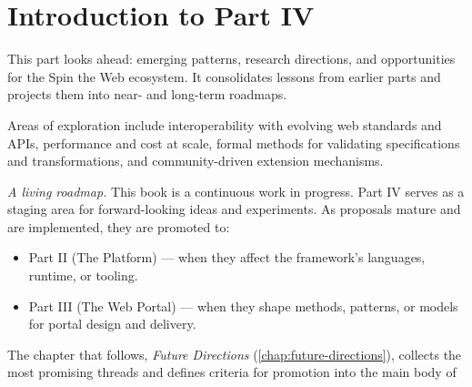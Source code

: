 
\chapter*{Introduction to Part IV}
\label{part:future}

This part looks ahead: emerging patterns, research directions, and opportunities for the Spin the Web ecosystem. It consolidates lessons from earlier parts and projects them into near- and long-term roadmaps.

Areas of exploration include interoperability with evolving web standards and APIs, performance and cost at scale, formal methods for validating specifications and transformations, and community-driven extension mechanisms.

\textit{A living roadmap.} This book is a continuous work in progress. Part IV serves as a staging area for forward-looking ideas and experiments. As proposals mature and are implemented, they are promoted to:
\begin{itemize}
  \item Part II (The Platform) --- when they affect the framework’s languages, runtime, or tooling.
  \item Part III (The Web Portal) --- when they shape methods, patterns, or models for portal design and delivery.
\end{itemize}

\noindent The chapter that follows, \emph{Future Directions} (\cref{chap:future-directions}), collects the most promising threads and defines criteria for promotion into the main body of


